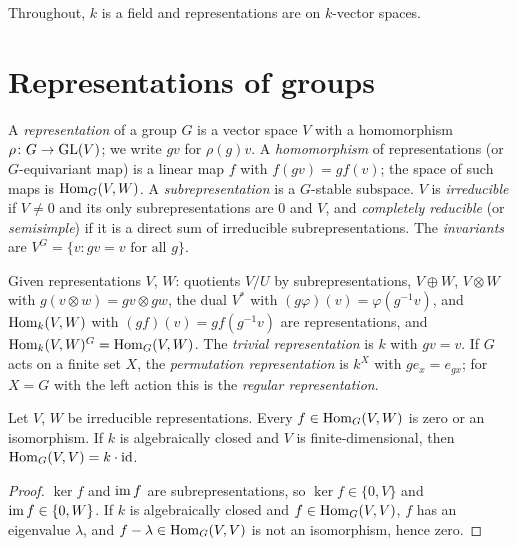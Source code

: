 Throughout, $k$ is a field and representations are on $k$-vector spaces.

\section{Representations of groups}\label{representation-theory:section-group-representations}

\begin{definition}\label{representation-theory:definition-representation}
A \emph{representation} of a group $G$ is a vector space $V$ with a homomorphism
$\rho \colon G \to \mathrm{GL}(V)$; we write $gv$ for $\rho(g)v$. A \emph{homomorphism} of representations (or
$G$-equivariant map) is a linear map $f$ with $f(gv) = gf(v)$; the space of such maps is $\operatorname{Hom}_G(V, W)$. A
\emph{subrepresentation} is a $G$-stable subspace. $V$ is \emph{irreducible} if $V \neq 0$ and its only
subrepresentations are $0$ and $V$, and \emph{completely reducible} (or \emph{semisimple}) if it is a direct
sum of irreducible subrepresentations. The \emph{invariants} are $V^G = \{v : gv = v \text{ for all } g\}$.
\end{definition}

\begin{example}\label{representation-theory:example-constructions}
Given representations $V$, $W$: quotients $V/U$ by subrepresentations, $V \oplus W$, $V \otimes W$ with
$g(v \otimes w) = gv \otimes gw$, the dual $V^*$ with $(g\varphi)(v) = \varphi(g^{-1}v)$, and $\operatorname{Hom}_k(V, W)$ with
$(gf)(v) = g f(g^{-1}v)$ are representations, and $\operatorname{Hom}_k(V, W)^G = \operatorname{Hom}_G(V, W)$. The \emph{trivial
representation} is $k$ with $gv = v$. If $G$ acts on a finite set $X$, the \emph{permutation representation} is
$k^X$ with $g e_x = e_{gx}$; for $X = G$ with the left action this is the \emph{regular representation}.
\end{example}

\begin{lemma}[Schur]\label{representation-theory:lemma-schur}
Let $V$, $W$ be irreducible representations. Every $f \in \operatorname{Hom}_G(V, W)$ is zero or an isomorphism. If $k$ is
algebraically closed and $V$ is finite-dimensional, then $\operatorname{Hom}_G(V, V) = k \cdot \mathrm{id}$.
\end{lemma}

\begin{proof}
$\ker f$ and $\operatorname{im} f$ are subrepresentations, so $\ker f \in \{0, V\}$ and $\operatorname{im} f \in \{0, W\}$. If $k$ is algebraically
closed and $f \in \operatorname{Hom}_G(V, V)$, $f$ has an eigenvalue $\lambda$, and $f - \lambda \in \operatorname{Hom}_G(V, V)$ is not an isomorphism,
hence zero.
\end{proof}

